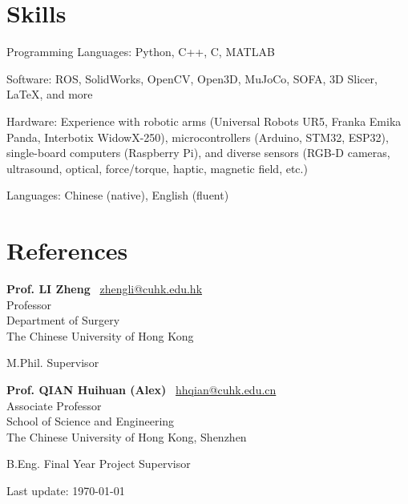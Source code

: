 \documentclass[11pt,letterpaper]{report}
\newcommand{\listitemspace}{0.25em}
\renewenvironment{itemize}
{\begin{list}{}{\setlength{\leftmargin}{0em}
			\setlength{\parskip}{0em}
			\setlength{\itemsep}{\listitemspace}
			\setlength{\parsep}{\listitemspace}}}
	{\end{list}}
\begin{document}
\section*{Skills}
\begin{itemize}
	\item {Programming Languages:} Python, C++, C, MATLAB
	\item {Software:} ROS, SolidWorks, OpenCV, Open3D, MuJoCo, SOFA, 3D Slicer, \LaTeX, and more
	\item {Hardware:} Experience with robotic arms (Universal Robots UR5, Franka Emika Panda, Interbotix WidowX-250), microcontrollers (Arduino, STM32, ESP32), single-board computers (Raspberry Pi), and diverse sensors (RGB-D cameras, ultrasound, optical, force/torque, haptic, magnetic field, etc.)
	\item {Languages:} Chinese (native), English (fluent)
\end{itemize}

\section*{References}
\begin{itemize}
	\item \textbf{Prof. LI Zheng} ~{\scriptsize \faEnvelope}\href{mailto:zhengli@cuhk.edu.hk}{zhengli@cuhk.edu.hk}\\
	Professor\\
	Department of Surgery\\
	The Chinese University of Hong Kong
	
	{M.Phil. Supervisor}

	\vspace{1ex}
	
	\item \textbf{Prof. QIAN Huihuan (Alex)} ~{\scriptsize \faEnvelope}\href{mailto:hhqian@cuhk.edu.cn}{hhqian@cuhk.edu.cn}\\
	Associate Professor\\School of Science and Engineering\\The Chinese University of Hong Kong, Shenzhen

	{B.Eng. Final Year Project Supervisor}

\end{itemize}
	
\begin{center}
	\vfill
	Last update: \monthyeardate\today
\end{center}
	
\end{document}
